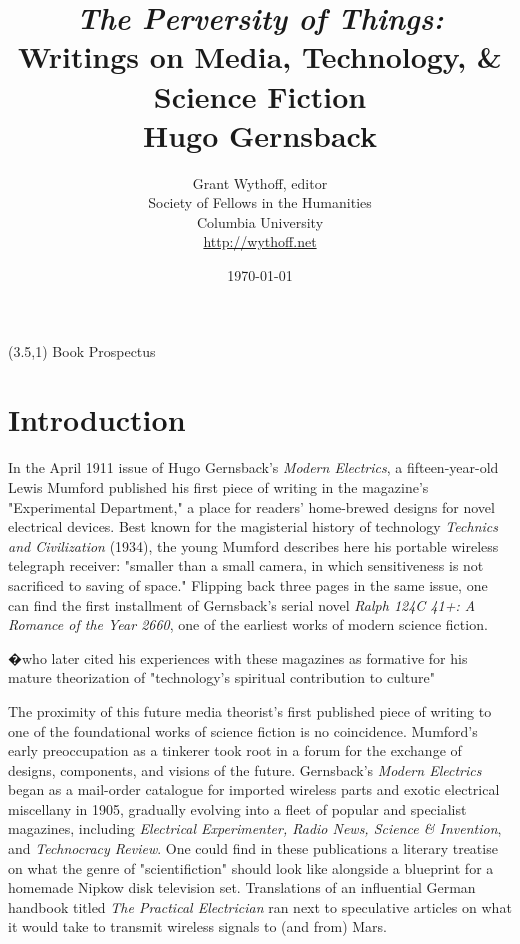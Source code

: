 \documentclass{article}
\title{ \textit{The Perversity of Things:} \\ 
{Writings on Media, Technology, \& Science Fiction} \\
Hugo Gernsback}
\author{Grant Wythoff, editor \\
Society of Fellows in the Humanities \\
Columbia University \\
\url{http://wythoff.net}
}
\date{\today}
\begin{document}
\begin{textblock}{5}(3.5,1)
\noindent\Large Book Prospectus
\end{textblock}

\maketitle

\section{Introduction}

In the April 1911 issue of Hugo Gernsback's \textit{Modern Electrics}, a fifteen-year-old Lewis Mumford published his first piece of writing in the magazine's "Experimental Department," a place for readers' home-brewed designs for novel electrical devices.  Best known for the magisterial history of technology \textit{Technics and Civilization} (1934), the young Mumford describes here his portable wireless telegraph receiver:  "smaller than a small camera, in which sensitiveness is not sacrificed to saving of space."  Flipping back three pages in the same issue, one can find the first installment of Gernsback's serial novel \textit{Ralph 124C 41+: A Romance of the Year 2660}, one of the earliest works of modern science fiction. \autocite{mumford_portable_1911}

�who later cited his experiences with these magazines as formative for his mature theorization of "technology's spiritual contribution to culture"

The proximity of this future media theorist's first published piece of writing to one of the foundational works of science fiction is no coincidence.  Mumford's early preoccupation as a tinkerer took root in a forum for the exchange of designs, components, and visions of the future.  Gernsback's \textit{Modern Electrics} began as a mail-order catalogue for imported wireless parts and exotic electrical miscellany in 1905, gradually evolving into a fleet of popular and specialist magazines, including \textit{Electrical Experimenter, Radio News, Science \& Invention}, and \textit{Technocracy Review}.  One could find in these publications a literary treatise on what the genre of "scientifiction" should look like alongside a blueprint for a homemade Nipkow disk television set.  Translations of an influential German handbook titled \textit{The Practical Electrician} ran next to speculative articles on what it would take to transmit wireless signals to (and from) Mars.
\end{document}
